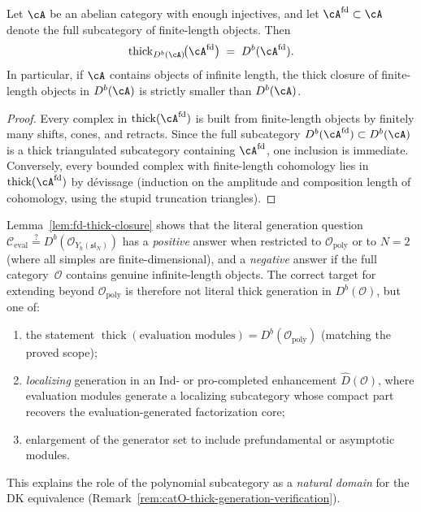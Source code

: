 \begin{lemma}
\label{lem:fd-thick-closure}
Let $\cA$ be an abelian category with enough injectives, and let
$\cA^{\mathrm{fd}} \subset \cA$ denote the full subcategory of
finite-length objects.  Then
\[
\operatorname{thick}_{D^b(\cA)}\!\bigl(\cA^{\mathrm{fd}}\bigr)
\;=\; D^b(\cA^{\mathrm{fd}}).
\]
In particular, if $\cA$ contains objects of infinite length, the
thick closure of finite-length objects in $D^b(\cA)$ is strictly
smaller than $D^b(\cA)$.
\end{lemma}

\begin{proof}
Every complex in $\operatorname{thick}(\cA^{\mathrm{fd}})$ is built
from finite-length objects by finitely many shifts, cones, and
retracts.  Since the full subcategory
$D^b(\cA^{\mathrm{fd}}) \subset D^b(\cA)$ is a thick triangulated
subcategory containing $\cA^{\mathrm{fd}}$, one inclusion is
immediate.  Conversely, every bounded complex with finite-length
cohomology lies in $\operatorname{thick}(\cA^{\mathrm{fd}})$ by
d\'{e}vissage (induction on the amplitude and composition length of
cohomology, using the stupid truncation triangles).
\end{proof}

\begin{remark}
\label{rem:fd-thick-closure-implications}
Lemma~\ref{lem:fd-thick-closure} shows that the literal generation
question
$\mathcal{C}_{\mathrm{eval}} \stackrel{?}{=}
D^b(\mathcal{O}_{Y_\hbar(\mathfrak{sl}_N)})$
has a \emph{positive} answer when restricted to
$\mathcal{O}_{\mathrm{poly}}$ or to $N = 2$ (where all simples are
finite-dimensional), and a \emph{negative} answer if the full
category~$\mathcal{O}$ contains genuine infinite-length objects.
The correct target for extending beyond
$\mathcal{O}_{\mathrm{poly}}$ is therefore not literal thick
generation in $D^b(\mathcal{O})$, but one of:
\begin{enumerate}[label=\textup{(\alph*)}]
\item the statement
  $\operatorname{thick}(\text{evaluation modules}) =
  D^b(\mathcal{O}_{\mathrm{poly}})$
  (matching the proved scope);
\item \emph{localizing} generation in an Ind- or
  pro-completed enhancement
  $\widehat{D}(\mathcal{O})$,
  where evaluation modules generate a localizing
  subcategory whose compact part recovers the evaluation-generated
  factorization core;
\item enlargement of the generator set to include
  prefundamental or asymptotic modules.
\end{enumerate}
This explains the role of the polynomial subcategory as a
\emph{natural domain} for the DK equivalence
(Remark~\ref{rem:catO-thick-generation-verification}).
\end{remark}

